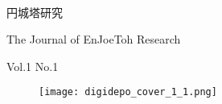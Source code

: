 \documentclass[10pt, a5paper, twoside]{jsarticle}
\theoremstyle{definition}
\begin{document}
	\begin{center}

		~

		\fontsize{43pt}{20mm}\selectfont
		円城塔研究

		\vspace{3mm}

		\LARGE{The Journal of EnJoeToh Research}

		\vspace{3mm}

		\normalsize{Vol.1 No.1}

	\end{center}

	\vspace{10mm}

	\begin{figure}[h]

		\texttt{[image: digidepo\_cover\_1\_1.png]}
		
	\end{figure}{}

	\newpage

	\thispagestyle{empty}
	
	~
	
	\newpage
\end{document}
